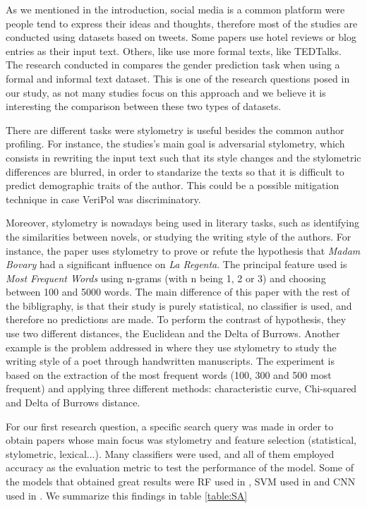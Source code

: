 As we mentioned in the introduction, social media is a common platform were people tend to express their ideas and thoughts, therefore most of the studies are conducted using datasets based on tweets. Some papers \cite{delmondes2022multi,radha2022feature,tai2020online,raghunadha2020author,moze2019profiling} use hotel reviews or blog entries as their input text. Others, like \cite{dayanik2021disentangling} use more formal texts, like TEDTalks. The research conducted in \cite{escobar2021gender} compares the gender prediction task when using a formal and informal text dataset. This is one of the research questions posed in our study, as not many studies focus on this approach and we believe it is interesting the comparison between these two types of datasets. 

There are different tasks were stylometry is useful besides the common author profiling. For instance, the studies's \cite{emmery2021adversarial,dayanik2021disentangling} main goal is adversarial stylometry, which consists in rewriting the input text such that its style changes and the stylometric differences are blurred, in order to standarize the texts so that it is difficult to predict demographic traits of the author. This could be a possible mitigation technique in case VeriPol was discriminatory.

Moreover, stylometry is nowadays being used in literary tasks, such as identifying the similarities between novels, or studying the writing style of the authors. For instance, the paper \cite{lozano2020nueva} uses stylometry to prove or refute the hypothesis that \textit{Madam Bovary} had a significant influence on \textit{La Regenta}. The principal feature used is \textit{Most Frequent Words} using n-grams (with n being 1, 2 or 3) and choosing between 100 and 5000 words. The main difference of this paper with the rest of the bibligraphy, is that their study is purely statistical, no classifier is used, and therefore no predictions are made. To perform the contrast of hypothesis, they use two different distances, the Euclidean and the Delta of Burrows. Another example is the problem addressed in \cite{RUIZ-CORNEJO2022} where they use stylometry to study the writing style of a poet through handwritten manuscripts. The experiment is based on the extraction of the most frequent words (100, 300 and 500 most frequent) and applying three different methods: characteristic curve, Chi-squared and Delta of Burrows distance.  

For our first research question, a specific search query was made in order to obtain papers whose main focus was stylometry and feature selection (statistical, stylometric, lexical...). Many classifiers were used, and all of them employed accuracy as the evaluation metric to test the performance of the model. Some of the models that obtained great results were \acrshort{RF} used in \cite{ouni2021toward,raghunadha2020author}, \acrshort{SVM} used in \cite{gomez2019convolutional,wanner2017relevance,grivas2015author} and \acrshort{CNN} used in \cite{surendran2017stylometry,gomez2019convolutional}. We summarize this findings in table \ref{table:SA}


